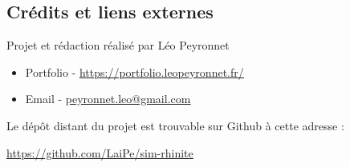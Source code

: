 \documentclass[12pt,french,titlepage]{article}
\begin{document}
\newpage





\subsection{Crédits et liens externes}
Projet et rédaction réalisé par Léo Peyronnet
\begin{itemize}
\item Portfolio - \underline{\href{https://portfolio.leopeyronnet.fr/}{https://portfolio.leopeyronnet.fr/}}
\item Email - \underline{\href{mailto:peyronnet.leo@gmail.com}{peyronnet.leo@gmail.com}}\\
\end{itemize}

Le dépôt distant du projet est trouvable sur Github à cette adresse :

\underline{\href{https://github.com/LaiPe/sim-rhinite}{https://github.com/LaiPe/sim-rhinite}}
\end{document}
